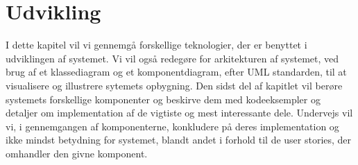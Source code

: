 \chapter{Udvikling}
I dette kapitel vil vi gennemgå forskellige teknologier, der er benyttet i udviklingen af systemet.
Vi vil også redegøre for arkitekturen af systemet, ved brug af et klassediagram og et komponentdiagram, efter UML standarden, til at visualisere og illustrere sytemets opbygning.
Den sidst del af kapitlet vil berøre systemets forskellige komponenter og beskirve dem med kodeeksempler og detaljer om implementation af de vigtiste og mest interessante dele. 
Undervejs vil vi, i gennemgangen af komponenterne, konkludere på deres implementation og ikke mindst betydning for systemet, blandt andet i forhold til de user stories, der omhandler den givne komponent.









